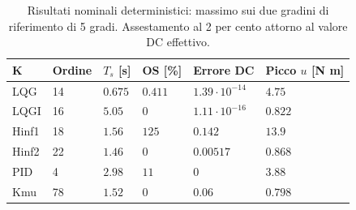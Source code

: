 \begin{table}[htbp]\centering\small
\begin{tabular}{llllll}\toprule
K & Ordine & $T_s$ [s] & OS [\%] & Errore DC & Picco $u$ [N m]\\\midrule
LQG & 14 & $0.675$ & $0.411$ & $1.39\cdot10^{-14}$ & $4.75$\\
LQGI & 16 & $5.05$ & $0$ & $1.11\cdot10^{-16}$ & $0.822$\\
Hinf1 & 18 & $1.56$ & $125$ & $0.142$ & $13.9$\\
Hinf2 & 22 & $1.46$ & $0$ & $0.00517$ & $0.868$\\
PID & 4 & $2.98$ & $11$ & $0$ & $3.88$\\
Kmu & 78 & $1.52$ & $0$ & $0.06$ & $0.798$\\
\bottomrule\end{tabular}
\caption{Risultati nominali deterministici: massimo sui due gradini di riferimento di 5 gradi. Assestamento al 2 per cento attorno al valore DC effettivo.}
\end{table}
